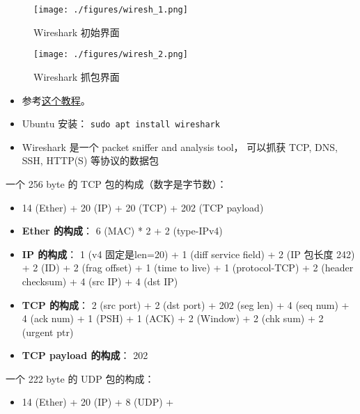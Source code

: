 
\begin{issues}
\issueDraft
\end{issues}

\begin{figure}[ht]
\centering
\texttt{[image: ./figures/wiresh\_1.png]}
\caption{Wireshark 初始界面} \label{wiresh_fig1}
\end{figure}

\begin{figure}[ht]
\centering
\texttt{[image: ./figures/wiresh\_2.png]}
\caption{Wireshark 抓包界面} \label{wiresh_fig2}
\end{figure}


\begin{itemize}
\item 参考\href{https://www.varonis.com/blog/how-to-use-wireshark}{这个教程}。
\item Ubuntu 安装： \verb|sudo apt install wireshark|
\item Wireshark 是一个 packet sniffer and analysis tool， 可以抓获 TCP, DNS, SSH, HTTP(S)   等协议的数据包
\end{itemize}

一个 256 byte 的 TCP 包的构成（数字是字节数）：
\begin{itemize}
\item 14 (Ether) + 20 (IP) + 20 (TCP) + 202 (TCP payload)
\item \textbf{Ether 的构成}： 6 (MAC) * 2 + 2 (type-IPv4)
\item \textbf{IP 的构成}： 1 (v4 固定是len=20) + 1 (diff service field) + 2 (IP 包长度 242) + 2 (ID) + 2 (frag offset) + 1 (time to live) + 1 (protocol-TCP) + 2 (header checksum) + 4 (src IP) + 4 (dst IP)
\item \textbf{TCP 的构成}： 2 (src port) + 2 (dst port) + 202 (seg len) + 4 (seq num) + 4 (ack num) + 1 (PSH) + 1 (ACK) + 2 (Window) + 2 (chk sum) + 2 (urgent ptr)
\item \textbf{TCP payload 的构成}： 202
\end{itemize}

一个 222 byte 的 UDP 包的构成：
\begin{itemize}
\item 14 (Ether) + 20 (IP) + 8 (UDP) + 
\end{itemize}
